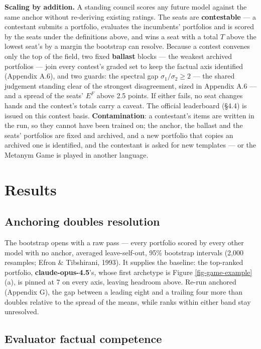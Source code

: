 \documentclass{article}
\begin{document}
\textbf{Scaling by addition.} A standing council scores any future model against the same anchor without re-deriving existing ratings. The seats are \textbf{contestable} --- a contestant submits a portfolio, evaluates the incumbents' portfolios and is scored by the seats under the definitions above, and wins a seat with a total \(T\) above the lowest seat's by a margin the bootstrap can resolve. Because a contest convenes only the top of the field, two fixed \textbf{ballast} blocks --- the weakest archived portfolios --- join every contest's graded set to keep the factual axis identified (Appendix A.6), and two guards: the spectral gap \(\sigma_1/\sigma_2 \ge 2\) --- the shared judgement standing clear of the strongest disagreement, sized in Appendix A.6 --- and a spread of the seats' \(E^{F}\) above 2.5 points. If either fails, no seat changes hands and the contest's totals carry a caveat. The official leaderboard (\S{}4.4) is issued on this contest basis. \textbf{Contamination}: a contestant's items are written in the run, so they cannot have been trained on; the anchor, the ballast and the seats' portfolios are fixed and archived, and a new portfolio that copies an archived one is identified, and the contestant is asked for new templates --- or the Metanym Game is played in another language.

\section{Results}\label{results}

\subsection{Anchoring doubles resolution}\label{anchoring-doubles-resolution}

The bootstrap opens with a raw pass --- every portfolio scored by every other model with no anchor, averaged leave-self-out, 95\% bootstrap intervals (2,000 resamples; Efron \& Tibshirani, 1993). It supplies the baseline: the top-ranked portfolio, \textbf{claude-opus-4.5}'s, whose first archetype is Figure \ref{fig-game-example}(a), is pinned at 7 on every axis, leaving headroom above. Re-run anchored (Appendix G), the gap between a leading eight and a trailing four more than doubles relative to the spread of the means, while ranks within either band stay unresolved.

\subsection{Evaluator factual competence}\label{evaluator-factual-competence}
\end{document}
